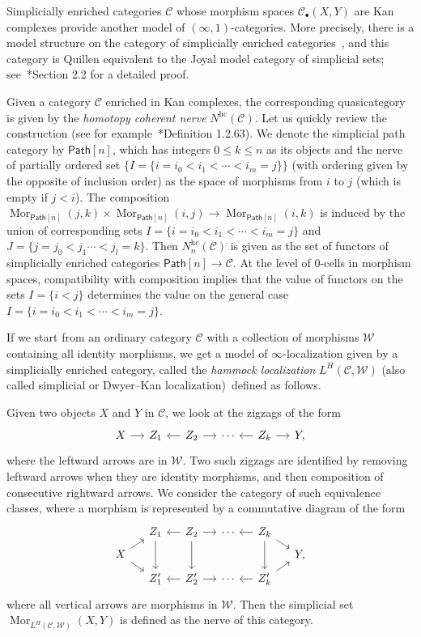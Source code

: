 \documentclass[a4paper,reqno]{amsart}
\theoremstyle{plain}
\theoremstyle{definition}
\theoremstyle{remark}
\numberwithin{equation}{section}
\newcommand{\cC}{\mathcal{C}}
\newcommand{\cW}{\mathcal{W}}
\newcommand{\Path}{\mathsf{Path}}
\newcommand{\hc}{\mathrm{hc}}
\DeclareMathOperator{\Mor}{Mor}
\begin{document}
Simplicially enriched categories $\cC$ whose morphism spaces $\cC_\bullet(X, Y)$ are Kan complexes provide another model of $(\infty, 1)$-categories. More precisely, there is a model structure on the category of simplicially enriched categories~\cite{berg:model}, and this category is Quillen equivalent to the Joyal model category of simplicial sets; see~\cite{lur:ht}*{Section 2.2} for a detailed proof.

Given a category $\cC$ enriched in Kan complexes, the corresponding quasicategory is given by the \emph{homotopy coherent nerve} $N^\hc(\cC)$. Let us quickly review the construction (see for example~\cite{land:inftybook}*{Definition 1.2.63}).
We denote the simplicial path category by $\Path[n]$, which has integers $0 \le k \le n$ as its objects and the nerve of partially ordered set $\{ I = \{ i = i_0 < i_1 < \cdots < i_m = j \} \}$ (with ordering given by the opposite of inclusion order) as the space of morphisms from $i$ to $j$ (which is empty if $j < i$).
The composition $\Mor_{\Path[n]}(j, k) \times \Mor_{\Path[n]}(i, j) \to \Mor_{\Path[n]}(i, k)$ is induced by the union of corresponding sets $I = \{ i = i_0 < i_1 < \cdots < i_m = j \}$ and $J = \{ j = j_0 < j_1 \cdots < j_l = k\}$.
Then $N^\hc_n(\cC)$ is given as the set of functors of simplicially enriched categories $\Path[n] \to \cC$.
At the level of $0$-cells in morphism spaces, compatibility with composition implies that the value of functors on the sets $I = \{i < j \}$ determines the value on the general case $I = \{ i = i_0 < i_1 < \cdots < i_m = j \}$.

If we start from an ordinary category $\cC$ with a collection of morphisms $\cW$ containing all identity morphisms, we get a model of $\infty$-localization given by a simplicially enriched category, called the \emph{hammock localization} $L^H(\cC,\cW)$ (also called simplicial or Dwyer--Kan localization)~\cite{dwkan:function}defined as follows.

Given two objects $X$ and $Y$ in $\cC$, we look at the zigzags of the form
\[
\begin{tikzcd}[column sep=small]
  X \arrow[r] & Z_1 & Z_2 \arrow[l] \arrow[r] & \cdots & Z_k \arrow[l] \arrow[r] & Y,
\end{tikzcd}
\]
where the leftward arrows are in $\cW$.
Two such zigzags are identified by removing leftward arrows when they are identity morphisms, and then composition of consecutive rightward arrows.
We consider the category of such equivalence classes, where a morphism is represented by a commutative diagram of the form
\[
\begin{tikzcd}[row sep=tiny, column sep=small]
   & Z_1 \arrow[dd] & Z_2 \arrow[l] \arrow[r] \arrow[dd] & \cdots & Z_k \arrow[l] \arrow[rd] \arrow[dd] & \\
  X \arrow[ru] \arrow[rd] & & & & & Y, \\
   & Z'_1 & Z'_2 \arrow[l] \arrow[r] & \cdots & Z'_k \arrow[l] \arrow[ru] &
\end{tikzcd}
\]
where all vertical arrows are morphisms in $\cW$.
Then the simplicial set $\Mor_{L^H(\cC, \cW)}(X, Y)$ is defined as the nerve of this category.
\end{document}
